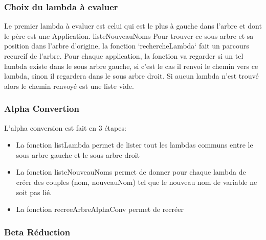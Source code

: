 \documentclass[a4paper,11pt,titlepage]{article}
\begin{document}
\subsubsection{Choix du lambda à evaluer}

Le premier lambda à evaluer est celui qui est le plus à gauche dans l'arbre et dont le père est une Application.
listeNouveauNoms
Pour trouver ce sous arbre et sa position dans l'arbre d'origine, la fonction `rechercheLambda` fait un parcours recurcif de l'arbre.
Pour chaque application, la fonction va regarder si un tel lambda existe dans le sous arbre gauche, si c'est le cas il renvoi le chemin vers ce lambda,
 sinon il regardera dans le sous arbre droit. Si aucun lambda n'est trouvé alors le chemin renvoyé est une liste vide.

\subsubsection{Alpha Convertion}

L'alpha conversion est fait en 3 étapes:
\begin{itemize}
 \item La fonction listLambda permet de lister tout les lambdas communs entre le sous arbre gauche et le sous arbre droit
 \item La fonction listeNouveauNoms permet de donner pour chaque lambda de créer des couples (nom, nouveauNom) tel que le nouveau
nom de variable ne soit pas lié.
 \item La fonction recreeArbreAlphaConv permet de recréer 
\end{itemize}


\subsubsection{Beta Réduction}
\end{document}
